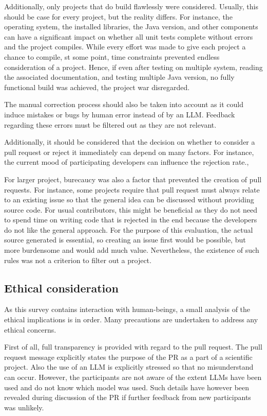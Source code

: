 Additionally, only projects that do build flawlessly were considered. Usually, this should be case for every project, but the reality differs. For instance, the operating system, the installed libraries, the Java version, and other components can have a significant impact on whether all unit tests complete without errors and the project compiles.  While every effort was made to give each project a chance to compile, st some point, time constraints prevented endless consideration of a project. Hence, if even after testing on multiple system, reading the associated documentation, and testing multiple Java version, no fully functional build was achieved, the project war disregarded.

The manual correction process should also be taken into account as it could induce mistakes or bugs by human error instead of by an \ac{LLM}. Feedback regarding these errors must be filtered out as they are not relevant. 


Additionally, it should be considered that the decision on whether to consider a pull request or reject it immediately can depend on many factors. For instance,  the current mood of participating developers can influence the rejection rate.\cite{detecting_emotional}, 

For larger project, burecaucy was also a factor that prevented the creation of pull requests. For instance, some projects require that pull request must always relate to an existing issue so that the general idea can be discussed without providing source code. For usual contributors, this might be beneficial as they do not need to spend time on writing code that is rejected in the end because the developers do not like the general approach. For the purpose of this evaluation, the actual source generated is essential, so creating an issue first would be possible,  but more burdensome  and would add much value. Nevertheless, the existence of such rules was not a criterion to filter out a project. 

\subsection{Ethical consideration}
As this survey contains interaction with human-beings, a small analysis of the ethical implications is in order. Many precautions are undertaken to address any ethical concerns. 

First of all, full transparency is provided  with regard to the pull request. The pull request message explicitly states the purpose of the PR as a part of a scientific project. Also the use of an \ac{LLM} is explicitly stressed so that no misunderstand can occur. However, the participants are not aware of the extent \acp{LLM} have been used and do not know which model was used. Such details have however been revealed during discussion of the PR if further feedback from new participants was unlikely.


